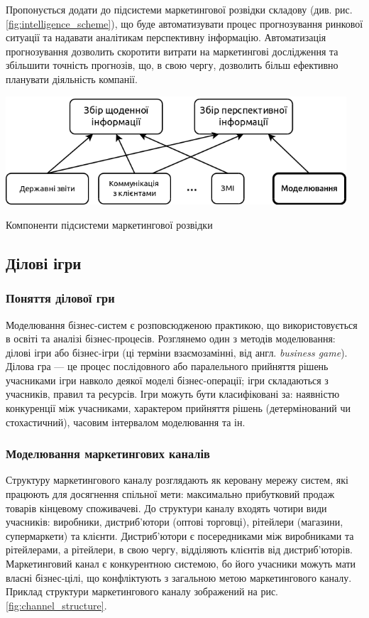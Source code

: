 Пропонується додати до підсистеми маркетингової розвідки складову (див. рис. \ref{fig:intelligence_scheme}), що буде автоматизувати процес прогнозування ринкової ситуації та надавати аналітикам перспективну інформацію. Автоматизація прогнозування дозволить скоротити витрати на маркетингові дослідження та збільшити точність прогнозів, що, в свою чергу, дозволить більш ефективно планувати діяльність компанії.

            \begin{stdfigure}
                \includegraphics[width=5in]{images/intelligence_scheme.png}
                \caption{Компоненти підсистеми маркетингової розвідки}
                \label{fig:intelligence_scheme}
            \end{stdfigure}    
  
    \subsection{Ділові ігри}
        \subsubsection{Поняття ділової гри}
Моделювання бізнес-систем є розповсюдженою практикою, що використовується в освіті та аналізі бізнес-процесів. Розглянемо один з методів моделювання: ділові ігри або бізнес-ігри (ці терміни взаємозамінні, від англ. {\it business game}). Ділова гра --- це процес послідовного або паралельного прийняття рішень учасниками ігри навколо деякої моделі бізнес-операції; ігри складаються з учасників, правил та ресурсів\cite{bg1, bg2}. Ігри можуть бути класифіковані за\cite{bg3}: наявністю конкуренції між учасниками, характером прийняття рішень (детермінований чи стохастичний), часовим інтервалом моделювання та ін.
        
        \subsubsection{Моделювання маркетингових каналів}
Структуру маркетингового каналу розглядають як керовану мережу систем, які працюють для досягнення спільної мети\cite{stern}: 
максимально прибутковий продаж товарів кінцевому споживачеві. До структури каналу входять чотири види учасників: виробники, дистриб’ютори (оптові торговці), рітейлери (магазини, супермаркети) та клієнти. Дистриб’ютори є посередниками між виробниками та рітейлерами, а рітейлери, в свою чергу, відділяють клієнтів від дистриб’юторів. Маркетинговий канал є конкурентною системою, бо його учасники можуть мати власні бізнес-цілі, що конфліктують з загальною метою маркетингового каналу. Приклад структури маркетингового каналу зображений на рис. \ref{fig:channel_structure}.

